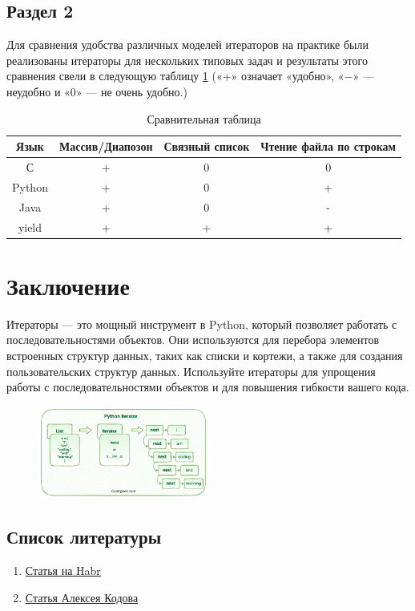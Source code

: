 \documentclass[14pt]{extreport}
\begin{document}
\section{Раздел 2}  
\sloppy
Для сравнения удобства различных моделей итераторов на практике были реализованы итераторы для нескольких типовых задач и результаты этого сравнения свели в следующую таблицу \ref{tab:example}
(«+» означает «удобно», «−» — неудобно и «0» — не очень удобно.)
\begin{table}[h]
\centering
\begin{tabular}{|c|c|c|c|}
\hline
Язык & Массив/Диапозон & Связный список  & Чтение файла по строкам   \\
\hline
С & + & 0  & 0   \\
\hline
Python & + & 0  & +   \\
\hline
Java & + & 0  & -   \\
\hline
yield & + & +  & +   \\
\hline
\end{tabular}
\caption{Сравнительная таблица}
\label{tab:example}
\end{table} 

\chapter{Заключение}  
\sloppy
Итераторы — это мощный инструмент в Python, который позволяет работать с последовательностями объектов. Они используются для перебора элементов встроенных структур данных, таких как списки и кортежи, а также для создания пользовательских структур данных. Используйте итераторы для упрощения работы с последовательностями объектов и для повышения гибкости вашего кода.
\begin{figure}[h]
\centering
\includegraphics[width=0.5\textwidth]{example-image.png}
\label{fig:example}
\end{figure}

\tableofcontents
\section{Список литературы}
\begin{enumerate}
\item \href{https://habr.com/ru/articles/840068/}{ Статья на Habr} 
\item \href{https://sky.pro/media/chto-takoe-iteratory-i-kak-ih-ispolzovat-v-python/}{ Статья Алексея Кодова} 
\end{enumerate}
\end{document}
